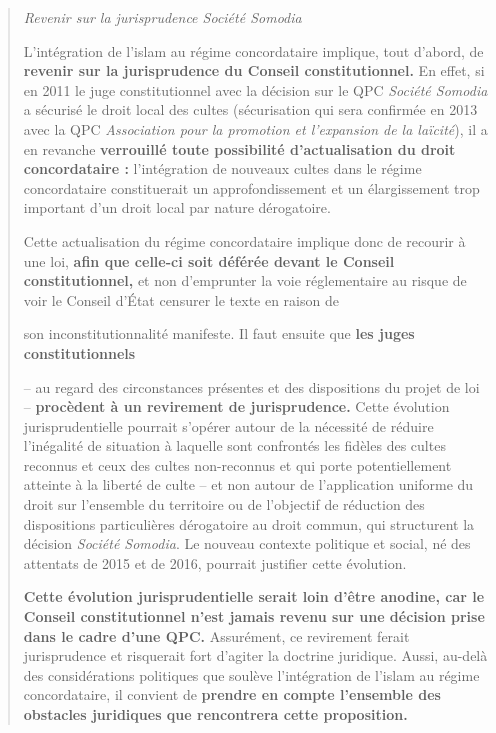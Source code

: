 \begin{quote}
\emph{Revenir sur la jurisprudence Société Somodia}

L'intégration de l'islam au régime concordataire implique, tout d'abord,
de \textbf{revenir sur la jurisprudence du Conseil constitutionnel.} En
effet, si en 2011 le juge constitutionnel avec la décision sur le QPC
\emph{Société Somodia} a sécurisé le droit local des cultes
(sécurisation qui sera confirmée en 2013 avec la QPC \emph{Association
pour la promotion et l'expansion de la laïcité}), il a en revanche
\textbf{verrouillé toute possibilité d'actualisation du droit
concordataire :} l'intégration de nouveaux cultes dans le régime
concordataire constituerait un approfondissement et un élargissement
trop important d'un droit local par nature dérogatoire.

Cette actualisation du régime concordataire implique donc de recourir à
une loi, \textbf{afin que celle-ci soit déférée devant le Conseil
constitutionnel,} et non d'emprunter la voie réglementaire au risque de
voir le Conseil d'État censurer le texte en raison de



son inconstitutionnalité manifeste. Il faut ensuite que \textbf{les
juges constitutionnels}

-- au regard des circonstances présentes et des dispositions du projet
de loi -- \textbf{procèdent à un revirement de jurisprudence.} Cette
évolution jurisprudentielle pourrait s'opérer autour de la nécessité de
réduire l'inégalité de situation à laquelle sont confrontés les fidèles
des cultes reconnus et ceux des cultes non-reconnus et qui porte
potentiellement atteinte à la liberté de culte -- et non autour de
l'application uniforme du droit sur l'ensemble du territoire ou de
l'objectif de réduction des dispositions particulières dérogatoire au
droit commun, qui structurent la décision \emph{Société Somodia}. Le
nouveau contexte politique et social, né des attentats de 2015 et de
2016, pourrait justifier cette évolution.

\textbf{Cette évolution jurisprudentielle serait loin d'être anodine,
car le Conseil constitutionnel n'est jamais revenu sur une décision
prise dans le cadre d'une QPC.} Assurément, ce revirement ferait
jurisprudence et risquerait fort d'agiter la doctrine juridique. Aussi,
au-delà des considérations politiques que soulève l'intégration de
l'islam au régime concordataire, il convient de \textbf{prendre en
compte l'ensemble des obstacles juridiques que rencontrera cette
proposition.}


\end{quote}
